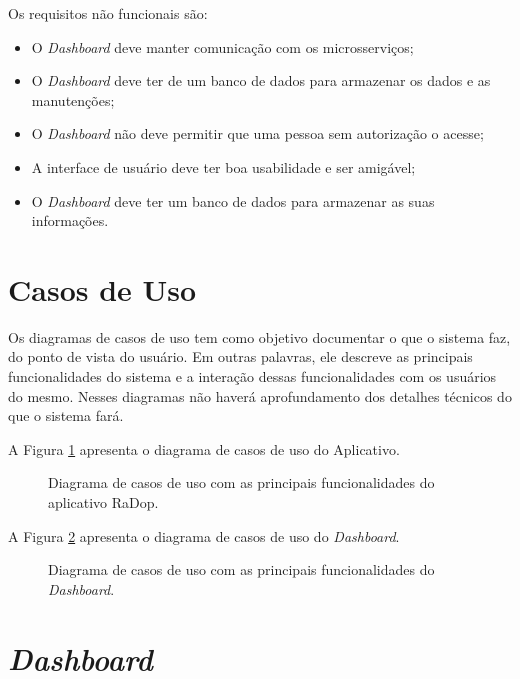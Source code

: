 Os requisitos não funcionais são:

\begin{itemize}
    \item O \textit{Dashboard} deve manter comunicação com os microsserviços;
    \item O \textit{Dashboard} deve ter de um banco de dados para armazenar os dados e as manutenções;
    \item O \textit{Dashboard} não deve permitir que uma pessoa sem autorização o acesse;
    \item A interface de usuário deve ter boa usabilidade e ser amigável;
    \item O \textit{Dashboard} deve ter um banco de dados para armazenar as suas informações.
\end{itemize}

\section{Casos de Uso}

Os diagramas de casos de uso tem como objetivo documentar o que o sistema faz, do ponto de vista do usuário. Em outras palavras, ele descreve as principais funcionalidades do sistema e a interação dessas funcionalidades com os usuários do mesmo. Nesses diagramas não haverá aprofundamento dos detalhes técnicos do que o sistema fará.

A Figura \ref{fig:casos_de_uso} apresenta o diagrama de casos de uso do Aplicativo.

\begin{figure}[H]
	\caption{\label{fig:casos_de_uso} Diagrama de casos de uso com as principais funcionalidades do aplicativo RaDop.}
\end{figure}\newpage

A Figura \ref{fig:diagrama-comm-soft} apresenta o diagrama de casos de uso do \textit{Dashboard}.

\begin{figure}[H]
	\caption{\label{fig:diagrama-comm-soft} Diagrama de casos de uso com as principais funcionalidades do \textit{Dashboard}.}
\end{figure}

\section{\textit{Dashboard}}

